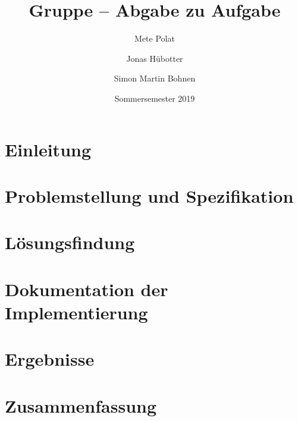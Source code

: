 \documentclass[course=erap]{aspdoc}
\author{Mete Polat \and Jonas Hübotter \and Simon Martin Bohnen}
\date{Sommersemester 2019} %
\title{Gruppe \theGroup{} -- Abgabe zu Aufgabe \theNumber}
\begin{document}
\maketitle

\section{Einleitung}


\section{Problemstellung und Spezifikation}


\section{Lösungsfindung}


\section{Dokumentation der Implementierung}


\section{Ergebnisse}


\section{Zusammenfassung}
\end{document}
